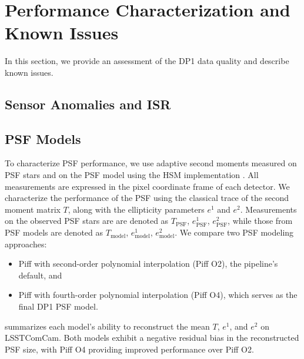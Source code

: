 \section{Performance Characterization and Known Issues}
\label{sec:performance}
%
In this section, we provide an assessment of the \gls{DP1} data quality and describe known issues.

\subsection{Sensor Anomalies and ISR}
\label{ssec:sensor_anomalies}

%

\subsection{PSF Models}
\label{ssec:psf_models}
To characterize \gls{PSF}  performance, we use adaptive second moments \citep{2002AJ....123..583B} measured on \gls{PSF} stars and on the PSF model using the \gls{HSM} implementation \citep{2003MNRAS.343..459H, 2005MNRAS.361.1287M}.
All measurements are expressed in the pixel coordinate frame of each detector.
We characterize the performance of the PSF using the classical trace of the  second moment matrix $T$, along with the ellipticity parameters $e^1$ and $e^2$.
Measurements on the observed PSF stars are are denoted as  $T_{\text{PSF}}$, $e^1_{\text{PSF}}$,  $e^2_{\text{PSF}}$, while those from PSF models are denoted as  $T_{\text{model}}$, $e^1_{\text{model}}$, $e^2_{\text{model}}$.
We compare two PSF modeling approaches:
\begin{itemize}
\item Piff with second-order polynomial interpolation (Piff O2), the pipeline's default, and
\item Piff with fourth-order polynomial interpolation (Piff O4), which serves as the final \gls{DP1} PSF model.	
\end{itemize}
 summarizes each model’s ability to reconstruct the mean $T$, $e^1$, and $e^2$ on  \gls{LSSTComCam}. 
Both models exhibit a negative residual bias in the reconstructed PSF size, with Piff O4 providing improved performance over Piff O2.




